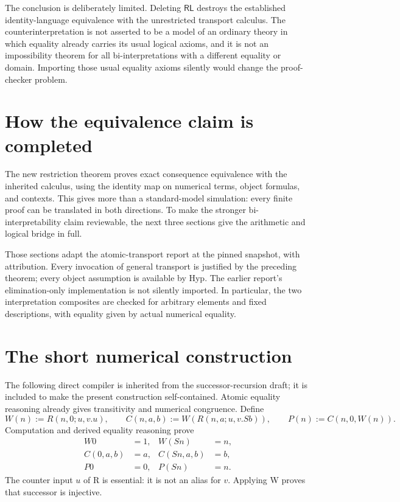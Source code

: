\documentclass[11pt,letterpaper]{article}
\theoremstyle{definition}\newtheorem{definition}[theorem]{Definition}
\theoremstyle{remark}\newtheorem{remark}[theorem]{Remark}
\begin{document}
The conclusion is deliberately limited. Deleting $\mathsf{RL}$ destroys
the established identity-language equivalence with the unrestricted
transport calculus. The counterinterpretation is not asserted to be a
model of an ordinary theory in which equality already carries its usual
logical axioms, and it is not an impossibility theorem for all
bi-interpretations with a different equality or domain. Importing those
usual equality axioms silently would change the proof-checker problem.


\section{How the equivalence claim is completed}
\label{sec:bridge-guide}

The new restriction theorem proves exact consequence equivalence with
the inherited calculus, using the identity map on numerical terms,
object formulas, and contexts. This gives more than a standard-model
simulation: every finite proof can be translated in both directions.
To make the stronger bi-interpretability claim reviewable, the next
three sections give the arithmetic and logical bridge in full.

Those sections adapt the atomic-transport report at the pinned snapshot,
with attribution\cite{atomic}. Every invocation of general transport
is justified by the preceding theorem; every object assumption is
available by Hyp. The earlier report's elimination-only implementation
is not silently imported. In particular, the two interpretation
composites are checked for arbitrary elements and fixed descriptions,
with equality given by actual numerical equality.

\section{The short numerical construction}
\label{sec:numerical}

The following direct compiler is inherited from the successor-recursion
draft\cite{recursor}; it is included to make the present construction
self-contained. Atomic equality reasoning already gives transitivity
and numerical congruence. Define
\[
 W(n):=R(n,0;u,v.u),\qquad
 C(n,a,b):=W(R(n,a;u,v.Sb)),\qquad
 P(n):=C(n,0,W(n)).
\]
Computation and derived equality reasoning prove
\begin{align*}
 W0&=1,&W(Sn)&=n,\\
 C(0,a,b)&=a,&C(Sn,a,b)&=b,\\
 P0&=0,&P(Sn)&=n.
\end{align*}
The counter input $u$ of R is essential: it is not an alias for $v$.
Applying W proves that successor is injective.
\end{document}
